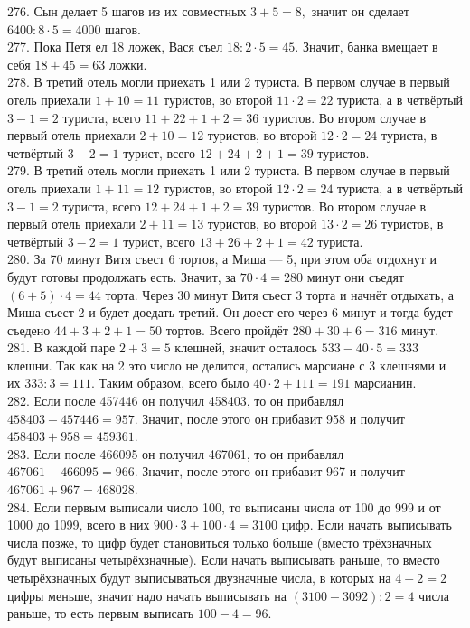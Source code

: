 \documentclass[12pt]{article}
\begin{document}
276. Сын делает 5 шагов из их совместных $3+5=8,$ значит он сделает $6400:8\cdot5=4000$ шагов.\\
277. Пока Петя ел 18 ложек, Вася съел $18:2\cdot5=45.$ Значит, банка вмещает в себя $18+45=63$ ложки.\\
278. В третий отель могли приехать 1 или 2 туриста. В первом случае в первый отель приехали $1+10=11$ туристов, во второй $11\cdot2=22$ туриста, а в четвёртый $3-1=2$ туриста, всего $11+22+1+2=36$ туристов. Во втором случае в первый отель приехали $2+10=12$ туристов, во второй $12\cdot2=24$ туриста, в четвёртый $3-2=1$ турист, всего $12+24+2+1=39$ туристов.\\
279. В третий отель могли приехать 1 или 2 туриста. В первом случае в первый отель приехали $1+11=12$ туристов, во второй $12\cdot2=24$ туриста, а в четвёртый $3-1=2$ туриста, всего $12+24+1+2=39$ туристов. Во втором случае в первый отель приехали $2+11=13$ туристов, во второй $13\cdot2=26$ туристов, в четвёртый $3-2=1$ турист, всего $13+26+2+1=42$ туриста.\\
280. За 70 минут Витя съест 6 тортов, а Миша --- 5, при этом оба отдохнут и будут готовы продолжать есть. Значит, за $70\cdot4=280$ минут они съедят $(6+5)\cdot4=44$ торта. Через 30 минут Витя съест 3 торта и начнёт отдыхать, а Миша съест 2 и будет доедать третий. Он доест его через 6 минут и тогда будет съедено $44+3+2+1=50$ тортов. Всего пройдёт $280+30+6=316$ минут.\\
281. В каждой паре $2+3=5$ клешней, значит осталось $533-40\cdot5=333$ клешни. Так как на 2 это число не делится, остались марсиане с 3 клешнями и их $333:3=111.$ Таким образом, всего было $40\cdot2+111=191$ марсианин.\\
282. Если после 457446 он получил 458403, то он прибавлял $458403-457446=957.$ Значит, после этого он прибавит 958 и получит $458403+958=459361.$\\
283. Если после 466095 он получил 467061, то он прибавлял $467061-466095=966.$ Значит, после этого он прибавит 967 и получит $467061+967=468028.$\\
284. Если первым выписали число 100, то выписаны числа от 100 до 999 и от 1000 до 1099, всего в них $900\cdot3+100\cdot4=3100$ цифр. Если начать выписывать числа позже, то цифр будет становиться только больше (вместо трёхзначных будут выписаны четырёхзначные). Если начать выписывать раньше, то вместо четырёхзначных будут выписываться двузначные числа, в которых на $4-2=2$ цифры меньше, значит надо начать выписывать на $(3100-3092):2=4$ числа раньше, то есть первым выписать $100-4=96.$\\
\end{document}
